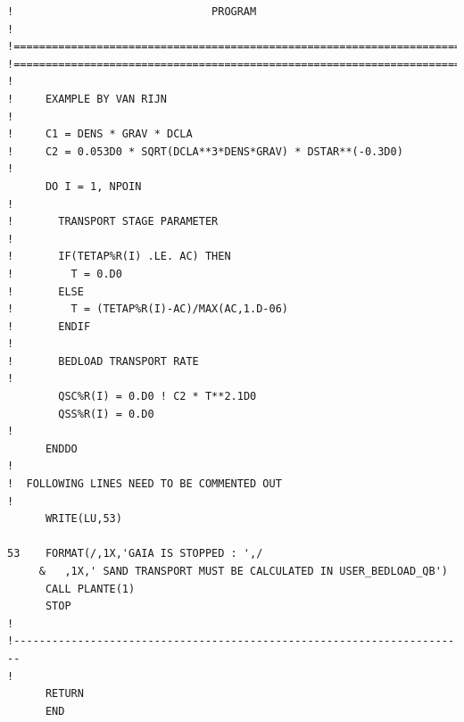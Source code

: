 \begin{lstlisting}[frame=trBL]
!                               PROGRAM                                !
!======================================================================!
!======================================================================!
!
!     EXAMPLE BY VAN RIJN
!
!     C1 = DENS * GRAV * DCLA
!     C2 = 0.053D0 * SQRT(DCLA**3*DENS*GRAV) * DSTAR**(-0.3D0)
!
      DO I = 1, NPOIN
!
!       TRANSPORT STAGE PARAMETER
!
!       IF(TETAP%R(I) .LE. AC) THEN
!         T = 0.D0
!       ELSE
!         T = (TETAP%R(I)-AC)/MAX(AC,1.D-06)
!       ENDIF
!
!       BEDLOAD TRANSPORT RATE
!
        QSC%R(I) = 0.D0 ! C2 * T**2.1D0
        QSS%R(I) = 0.D0
!
      ENDDO
!
!  FOLLOWING LINES NEED TO BE COMMENTED OUT
!
      WRITE(LU,53)

53    FORMAT(/,1X,'GAIA IS STOPPED : ',/
     &   ,1X,' SAND TRANSPORT MUST BE CALCULATED IN USER_BEDLOAD_QB')
      CALL PLANTE(1)
      STOP
!
!-----------------------------------------------------------------------
!
      RETURN
      END
\end{lstlisting}


